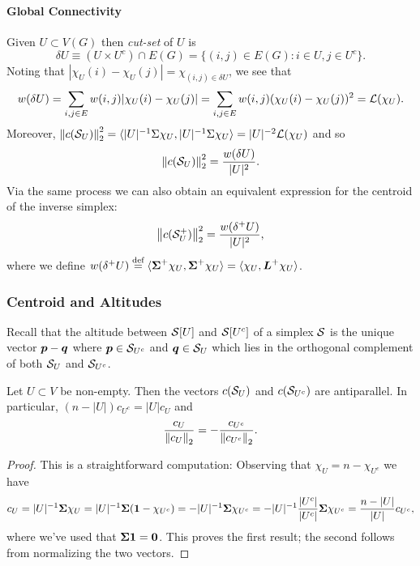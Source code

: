 \paragraph{Global Connectivity}
Given $U\subset V(G)$ then \emph{cut-set} of $U$ is 
\[\delta U \equiv (U\times U^c)\cap E(G)= \{(i,j)\in E(G): i\in U, j\in U^c\}.\]
Noting that $|\chi_U(i)-\chi_U(j)|=\chi_{(i,j)\in \delta U}$, we see that
\begin{align*}
    w(\delta U) = \sum_{i,j\in E} w(i,j)|\chi_U(i)-\chi_U(j)| = \sum_{i,j\in E} w(i,j)(\chi_U(i)-\chi_U(j))^2 = \mathcal{L}(\chi_U). 
\end{align*}
Moreover, $\norm{c(\mathcal{S}_U)}^2_2 = \langle |U|^{-1} \Sigma\chi_U,|U|^{-1} \Sigma\chi_U\rangle = |U|^{-2} \mathcal{L}(\chi_U)$ and so 
\begin{equation}
\label{eq:c(S_U)}
    \norm{c(\mathcal{S}_U)}_2^2 = \frac{w(\delta U)}{|U|^2}.
\end{equation}
Via the same process we can also obtain an equivalent expression for the centroid of the inverse simplex: 
\begin{equation}
\label{eq:c(S+_U)}
    \norm{c(\mathcal{S}^+_U)}_2^2 = \frac{w(\delta^+ U)}{|U|^2},
\end{equation}
where we define $w(\delta^+U) \overset{\text{def}}{=}  \langle \boldsymbol{\Sigma}^+\chi_U,\boldsymbol{\Sigma}^+\chi_U\rangle=\langle \chi_U,\vb*{L}^+\chi_U\rangle$. 




\subsubsection{Centroid and Altitudes}
Recall that the altitude between $\mathcal{S}[U]$ and $\mathcal{S}[U^c]$ of a simplex $\mathcal{S}$ is the unique vector $\vb*{p}-\vb*{q}$ where  $\vb*{p}\in \mathcal{S}_{U^c}$ and $\vb*{q}\in\mathcal{S}_{U}$ which lies in the orthogonal complement of both $\mathcal{S}_U$ and $\mathcal{S}_{U^c}$. 

\begin{lemma}
\label{lem:complimentary_centroids}
Let $U\subset V$ be non-empty. Then the vectors $c(\mathcal{S}_U)$ and $c(\mathcal{S}_{U^c})$ are antiparallel. In particular, $(n-|U|)c_{U^c} = |U|c_{U}$ and 
\[\frac{c_U}{\norm{c_U}_2}=-\frac{c_{U^c}}{\norm{c_{U^c}}_2}.\]
\end{lemma}
\begin{proof}
This is a straightforward computation: Observing that $\chi_U=n-\chi_{U^c}$ we have  
\[c_U = |U|^{-1}\boldsymbol{\Sigma}\chi_U = |U|^{-1}\boldsymbol{\Sigma}(\vb{1}-\chi_{U^c})=-|U|^{-1}\boldsymbol{\Sigma}\chi_{U^c}=-|U|^{-1}\frac{|U^c|}{|U^c|}\boldsymbol{\Sigma}\chi_{U^c}=\frac{n-|U|}{|U|}c_{U^c},\]
where we've used that $\boldsymbol{\Sigma}\vb{1}=\vb{0}$. This proves the first result; the second follows from normalizing the two vectors.
\end{proof}


